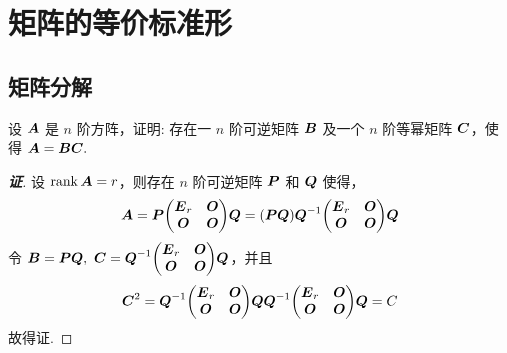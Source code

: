 \section{矩阵的等价标准形}

% 

\subsection{矩阵分解}

\begin{example}
    设 $\vb*{A}$ 是 $n$ 阶方阵，证明: 存在一 $n$ 阶可逆矩阵 $\vb*{B}$ 及一个 $n$ 阶等幂矩阵 $\vb*{C}$，使得 $\vb*{A}=\vb*{BC}.$
\end{example}
\begin{proof}[{\songti \textbf{证}}]
    设 $\rank\vb*{A}=r$，则存在 $n$ 阶可逆矩阵 $\vb*{P}$ 和 $\vb*{Q}$ 使得，
    $$\vb*{A}=\vb*{P}\mqty(\vb*{E}_r&\vb*{O}\\\vb*{O}&\vb*{O})\vb*{Q}=(\vb*{PQ})\vb*{Q}^{-1}\mqty(\vb*{E}_r&\vb*{O}\\\vb*{O}&\vb*{O})\vb*{Q}$$
    令 $\vb*{B}=\vb*{PQ},~\vb*{C}=\vb*{Q}^{-1}\mqty(\vb*{E}_r&\vb*{O}\\\vb*{O}&\vb*{O})\vb*{Q}$，并且
    $$\vb*{C}^2=\vb*{Q}^{-1}\mqty(\vb*{E}_r&\vb*{O}\\\vb*{O}&\vb*{O})\vb*{Q}\vb*{Q}^{-1}\mqty(\vb*{E}_r&\vb*{O}\\\vb*{O}&\vb*{O})\vb*{Q}=C$$
    故得证.
\end{proof}

